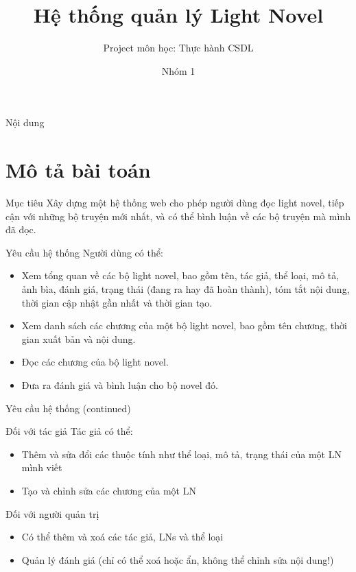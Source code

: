 \documentclass[12pt,aspectratio=169,handout]{beamer}
\title[HTQL Light Novel]{Hệ thống quản lý Light Novel}
\subtitle{Project môn học: Thực hành CSDL}
\author{Nhóm 1}
\institute{Đại học Bách Khoa Hà Nội}
\begin{document}
\titlepage

\begin{frame}{Nội dung}
    \tableofcontents
\end{frame}

\section{Mô tả bài toán}
\begin{frame}{Mục tiêu}
    Xây dựng một hệ thống web cho phép người dùng đọc light novel, tiếp cận với những bộ truyện mới nhất, và có thể bình luận về các bộ truyện mà mình đã đọc.
    \begin{block}{Yêu cầu hệ thống}
        Người dùng có thể:
        \begin{itemize}
            \item Xem tổng quan về các bộ light novel, bao gồm tên, tác giả, thể loại, mô tả, ảnh bìa, đánh giá, trạng thái (đang ra hay đã hoàn thành), tóm tắt nội dung, thời gian cập nhật gần nhất và thời gian tạo.
            \item Xem danh sách các chương của một bộ light novel, bao gồm tên chương, thời gian xuất bản và nội dung.
            \item Đọc các chương của bộ light novel.
            \item Đưa ra đánh giá và bình luận cho bộ novel đó.
        \end{itemize}
    \end{block}
\end{frame}

\begin{frame}{Yêu cầu hệ thống (continued)}
    \begin{block}{Đối với tác giả}
        Tác giả có thể:
        \begin{itemize}
            \item Thêm và sửa đổi các thuộc tính như thể loại, mô tả, trạng thái của một LN mình viết 
            \item Tạo và chỉnh sửa các chương của một LN 
        \end{itemize}
    \end{block}
    \pause
    \begin{block}{Đối với người quản trị}
        \begin{itemize}
            \item Có thể thêm và xoá các tác giả, LNs và thể loại
            \item Quản lý đánh giá (chỉ có thể xoá hoặc ẩn, không thể chỉnh sửa nội dung!)
        \end{itemize}
    \end{block}
\end{frame}
\end{document}
